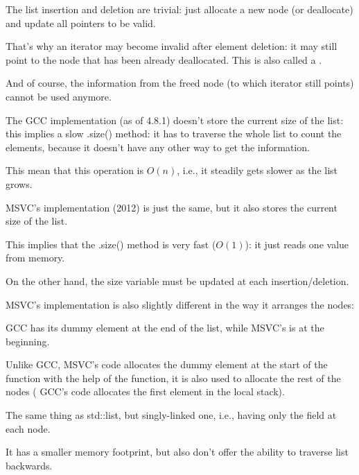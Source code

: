 The list insertion and deletion are trivial: just allocate a new node (or deallocate) and update all pointers
to be valid.

That's why an iterator may become invalid after element deletion: 
it may still point to the node that has been already deallocated.
This is also called a .

And of course, the information from the freed node (to which iterator still points) 
cannot be used anymore.

The GCC implementation (as of 4.8.1) doesn't store the current size of the list: this implies a slow .size() method:
it has to traverse the whole list to count the elements, because it doesn't have any other way to get the information.

This mean that this operation is $O(n)$, i.e., it steadily gets slower as the list grows.





\label{MSVC_std_list}

MSVC's implementation (2012) is just the same, but it also stores the current size of the list.

This implies that the .size() method is very fast ($O(1)$): it just reads one value from memory.

On the other hand, the size variable must be updated at each insertion/deletion.

MSVC's implementation is also slightly different in the way it arranges the nodes:



GCC has its dummy element at the end of the list, while MSVC's is at the beginning.



Unlike GCC, MSVC's code allocates the dummy element at the start of the function with the help of the  function,
it is also used to allocate the rest of the nodes (
GCC's code allocates the first element in the local stack).




The same thing as std::list, but singly-linked one, i.e., having only the  field at each node.

It has a smaller memory footprint, but also don't offer the ability to traverse list backwards.

